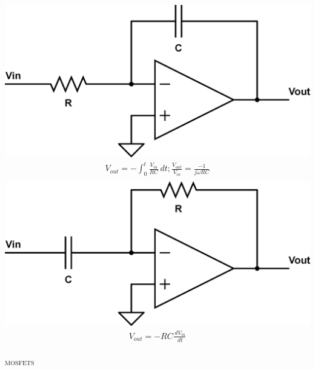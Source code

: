 \documentclass[9pt,letterpaper,english]{article}
\begin{document}
\begin{multicols}{2}
\includegraphics[scale=0.2]{opamp-integrator.eps}
\begin{align*}
V_{out} = -\int_0^t \frac{V_{in}}{RC} \,dt; \frac{V_{out}}{V_{in}} = \frac{-1}{j \omega RC} \tag*{Miller Integrator / Low-pass}\\
\end{align*}
\includegraphics[scale=0.2]{opamp-differentiator.eps}
\begin{align*}
V_{out} = -RC \frac{\,dV_{in}}{\,dt} \tag*{Differentiator / High-pass}\\
\end{align*}
\end{multicols}


\textsc{mosfets}\\
\end{document}
